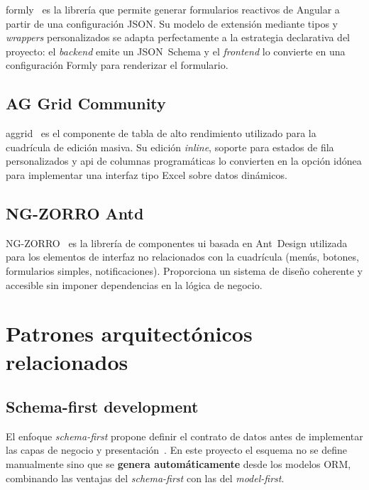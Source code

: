 \gls{formly}~\cite{formly} es la librería que permite generar formularios reactivos de
Angular a partir de una configuración JSON. Su modelo de extensión mediante tipos y
\textit{wrappers} personalizados se adapta perfectamente a la estrategia declarativa del
proyecto: el \textit{backend} emite un JSON~Schema y el \textit{frontend} lo convierte en
una configuración Formly para renderizar el formulario.

\subsection{AG Grid Community}
\label{subsec:aggrid}

\gls{aggrid}~\cite{aggrid} es el componente de tabla de alto rendimiento utilizado para la
cuadrícula de edición masiva. Su edición \textit{inline}, soporte para estados de fila
personalizados y \gls{api} de columnas programáticas lo convierten en la opción idónea para
implementar una interfaz tipo Excel sobre datos dinámicos.

\subsection{NG-ZORRO Antd}
\label{subsec:ngzorro}

NG-ZORRO~\cite{ngzorro} es la librería de componentes \gls{ui} basada en Ant~Design
utilizada para los elementos de interfaz no relacionados con la cuadrícula (menús, botones,
formularios simples, notificaciones). Proporciona un sistema de diseño coherente y
accesible sin imponer dependencias en la lógica de negocio.

\section{Patrones arquitectónicos relacionados}
\label{sec:patrones}

\subsection{Schema-first development}
\label{subsec:schema-first}

El enfoque \textit{schema-first} propone definir el contrato de datos antes de implementar
las capas de negocio y presentación~\cite{schemafirst}. En este proyecto el esquema no se
define manualmente sino que se \textbf{genera automáticamente} desde los modelos ORM,
combinando las ventajas del \textit{schema-first} con las del \textit{model-first}.

